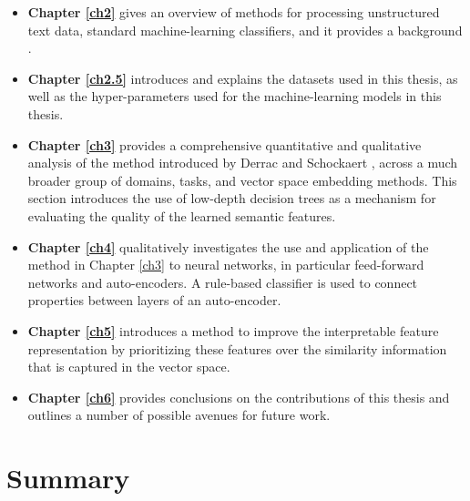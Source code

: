 \begin{itemize}
	\item \textbf{Chapter \ref{ch2}} gives an overview of methods for processing unstructured text data, standard machine-learning classifiers, and it provides a background .
	\item \textbf{Chapter \ref{ch2.5}} introduces and explains the datasets used in this thesis, as well as  the hyper-parameters  used for the machine-learning models in this thesis.
	\item \textbf{Chapter \ref{ch3}} provides a comprehensive quantitative and qualitative analysis of the method introduced by Derrac and Schockaert \cite{Derrac2015}, across a much broader group of domains, tasks, and vector space embedding methods. This section introduces the use of low-depth decision trees as a mechanism for evaluating the quality of the learned semantic features.  
	\item \textbf{Chapter \ref{ch4}} qualitatively investigates the use and application of the method in Chapter \ref{ch3} to neural networks, in particular feed-forward networks and auto-encoders. A rule-based classifier is used to connect properties between layers of an auto-encoder.
	\item \textbf{Chapter \ref{ch5}} introduces a  method to improve the interpretable feature representation by prioritizing these features over the similarity information that is captured in the vector space.
	\item \textbf{Chapter \ref{ch6}} provides conclusions on the contributions of this thesis and outlines a number of possible avenues for future work.
\end{itemize}


\section{Summary}

